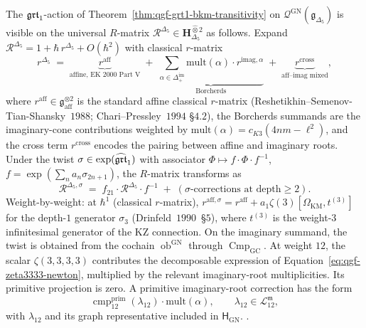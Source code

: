 \begin{remark}
\label{rem:qgf-r-matrix-twist-delta5}
The $\mathfrak{grt}_1$-action of
Theorem~\ref{thm:qgf-grt1-bkm-transitivity} on
$\mathcal Q^{\mathrm{GN}}(\mathfrak g_{\Delta_5})$ is visible
on the universal $R$-matrix $\mathcal R^{\Delta_5} \in
\mathbf H_{\Delta_5}^{\hat\otimes 2}$ as follows. Expand
$\mathcal R^{\Delta_5} = 1 + \hbar\,r^{\Delta_5} + O(\hbar^2)$
with classical $r$-matrix
\[
r^{\Delta_5}
\;=\;
\underbrace{r^{\mathrm{aff}}}_{\text{affine, EK~$2000$ Part~V}}
\;+\;
\underbrace{\sum_{\alpha \in \Delta_+^{\mathrm{im}}}
\mathrm{mult}(\alpha)\cdot r^{\mathrm{imag}, \alpha}}_{\text{Borcherds}}
\;+\;
\underbrace{r^{\mathrm{cross}}}_{\text{aff--imag mixed}},
\]
where $r^{\mathrm{aff}} \in \mathfrak g_{\mathrm{aff}}^{\otimes 2}$
is the standard affine classical $r$-matrix (Reshetikhin--Semenov-
Tian-Shansky~$1988$; Chari--Pressley~$1994$ \S$4.2$), the
Borcherds summands are the imaginary-cone contributions weighted by
$\mathrm{mult}(\alpha) = c_{K3}(4nm - \ell^2)$, and the cross term
$r^{\mathrm{cross}}$ encodes the pairing between affine and
imaginary roots. Under the twist
$\sigma \in \exp(\widehat{\mathfrak{grt}}_1)$ with associator
$\Phi \mapsto f\cdot\Phi\cdot f^{-1}$,
$f = \exp(\sum_n a_n \sigma_{2n+1})$, the $R$-matrix transforms as
\[
\mathcal R^{\Delta_5, \sigma}
\;=\;
f_{21}\cdot\mathcal R^{\Delta_5}\cdot f^{-1}
\;+\;
(\sigma\text{-corrections at depth} \ge 2).
\]
Weight-by-weight: at $\hbar^1$ (classical $r$-matrix),
$r^{\mathrm{aff}, \sigma} = r^{\mathrm{aff}} +
a_1\zeta(3)[\Omega_{\mathrm{KM}}, t^{(3)}]$ for the depth-$1$
generator $\sigma_3$ (Drinfeld~$1990$~\S$5$), where $t^{(3)}$ is
the weight-$3$ infinitesimal generator of the KZ connection.  On the
imaginary summand, the twist is obtained from the cochain
$\operatorname{ob}^{\mathrm{GN}}$ through
$\operatorname{Cmp}_{\mathrm{GC}}$.  At weight $12$, the scalar
$\zeta(3,3,3,3)$ contributes the decomposable expression of
Equation~\eqref{eq:qgf-zeta3333-newton}, multiplied by the relevant
imaginary-root multiplicities.  Its primitive projection is zero.
A primitive imaginary-root correction has the form
\[
 \operatorname{cmp}^{\mathrm{prim}}_{12}(\lambda_{12})
 \cdot\mathrm{mult}(\alpha),
 \qquad \lambda_{12}\in\mathcal L^{\mathfrak m}_{12},
\]
with $\lambda_{12}$ and its graph representative included in
$\mathsf H_{\mathrm{GN}}$.
\cite{Drinfeld1990,EtingofKazhdan2000,ReshetikhinSemenovTianShansky1988,
 GritsenkoNikulin1998,Brown2012}.
\end{remark}

